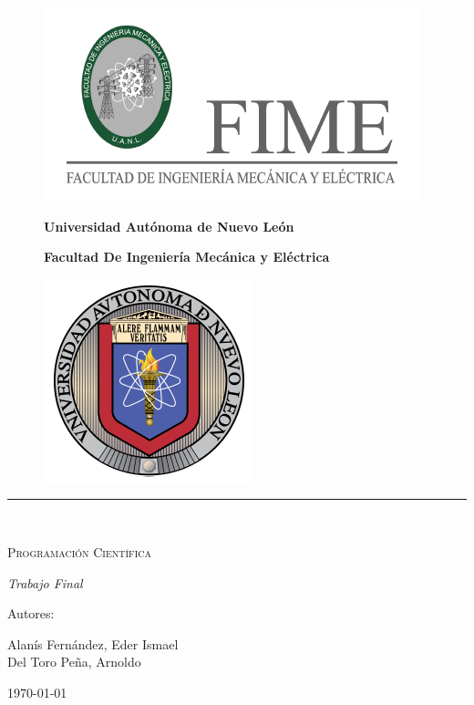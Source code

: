 \documentclass{article}
\begin{document}
\begin{titlepage}
		\begin{figure}
		\begin{minipage}[c]{0.15 \linewidth}
			\includegraphics[scale = 0.3]{fime.jpg}
		\end{minipage} \hspace{0.5 cm}
		\begin{minipage}[t]{0.6 \linewidth}
		    {\bfseries \centering \Large Universidad Autónoma de Nuevo León \par}
		{\centering \bfseries \large Facultad De Ingeniería  Mecánica y Eléctrica \par}
		\end{minipage} \hspace{0.5 cm}
		\begin{minipage}[c]{0.15 \linewidth}
			\includegraphics[scale= 0.3]{uanl.png}
		\end{minipage}
		\end{figure}
		
		\centering
		
		\rule {\linewidth}{0.75mm} \\
		\vspace{3cm}
		{\scshape\Huge Programación Científica \par}
		\vspace{3cm}
		{\itshape\Large Trabajo Final \par}
		\vfill
		{\Large Autores: \par}
		{\Large Alanís Fernández, Eder Ismael \\ Del Toro Peña, Arnoldo  \par}
		\today
	\end{titlepage}
\end{document}
